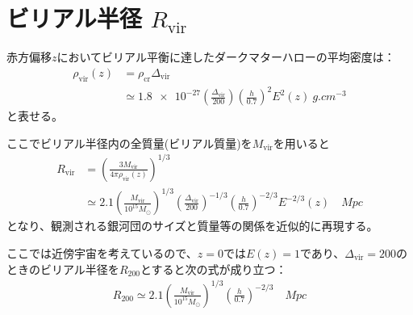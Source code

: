 \section{ビリアル半径 $R_\text{vir}$}

赤方偏移$z$においてビリアル平衡に達したダークマターハローの平均密度は：
\begin{align}
	\rho_\text{vir}(z) &= \rho_\text{cr} \Delta_\text{vir} \\
	&\simeq \num{1.8e-27} \left( \frac{\Delta_\text{vir}}{200}\right) \left(\frac{h}{0.7}\right)^2 E^2(z) \ \si{g. cm^{-3}}
\end{align}
と表せる。

ここでビリアル半径内の全質量(ビリアル質量)を$M_\text{vir}$を用いると
\begin{align}
	R_\text{vir} &= \left( \frac{3 M_\text{vir}}{4 \pi \rho_\text{vir}(z)} \right)^{1/3} \\
	&\simeq 2.1 \left( \frac{M_\text{vir}}{10^{15} M_\odot} \right)^{1/3} \left( \frac{\Delta_\text{vir}}{200} \right)^{-1/3} \left( \frac{h}{0.7} \right)^{-2/3} E^{-2/3}(z) \quad \si{Mpc}
\end{align}
となり、観測される銀河団のサイズと質量等の関係を近似的に再現する。

ここでは近傍宇宙を考えているので、$z=0$では$E(z) = 1$であり、$\Delta_\text{vir} = 200$のときのビリアル半径を$R_{200}$とすると次の式が成り立つ：
\begin{align}
	R_{200} \simeq 2.1 \left( \frac{M_\text{vir}}{10^{15} M_\odot} \right)^{1/3} \left( \frac{h}{0.7} \right)^{-2/3} \quad \si{Mpc}
\end{align}


%	
%	
%	
%	
%	
%	

